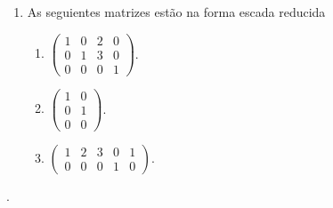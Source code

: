\begin{example}
\begin{enumerate}
    \item As seguientes matrizes estão na forma escada reducida

          \begin{enumerate}
            \item

                  \begin{math}
                    \begin{pmatrix}
                      1 & 0 & 2 & 0 \\
                      0 & 1 & 3 & 0 \\
                      0 & 0 & 0 & 1
                    \end{pmatrix}
                  \end{math}.

            \item

                  \begin{math}
                    \begin{pmatrix}
                      1 & 0 \\
                      0 & 1 \\
                      0 & 0
                    \end{pmatrix}
                  \end{math}.


            \item

                  \begin{math}
                    \begin{pmatrix}
                      1 & 2 & 3 & 0 & 1 \\
                      0 & 0 & 0 & 1 & 0
                    \end{pmatrix}
                  \end{math}.
          \end{enumerate}

  \end{enumerate}
\end{example}

\begin{remark}
  .
\end{remark}
